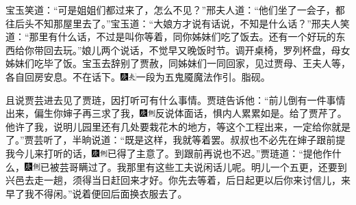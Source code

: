 宝玉笑道：“可是姐姐们都过来了，怎么不见？”邢夫人道：“他们坐了一会子，都往后头不知那屋里去了。”宝玉道：“大娘方才说有话说，不知是什么话？”邢夫人笑道：“那里有什么话，不过是叫你等着，同你姊妹们吃了饭去。还有一个好玩的东西给你带回去玩。”娘儿两个说话，不觉早又晚饭时节。调开桌椅，罗列杯盘，母女姊妹们吃毕了饭。宝玉去辞别了贾赦，同姊妹们一同回家，见过贾母、王夫人等，各自回房安息。不在话下。{\includegraphics[width=3mm]{../Images/00004}\includegraphics[width=3mm]{../Images/00012}\footnotesize \kaishu 一段为五鬼魇魔法作引。脂砚。}

且说贾芸进去见了贾琏，因打听可有什么事情。贾琏告诉他：“前儿倒有一件事情出来，偏生你婶子再三求了我，{\includegraphics[width=3mm]{../Images/00004}\includegraphics[width=3mm]{../Images/00011}\footnotesize \kaishu 反说体面话，惧内人累累如是。}给了贾芹了。他许了我，说明儿园里还有几处要栽花木的地方，等这个工程出来，一定给你就是了。”贾芸听了，半晌说道：“既是这样，我就等着罢。叔叔也不必先在婶子跟前提我今儿来打听的话，{\includegraphics[width=3mm]{../Images/00004}\includegraphics[width=3mm]{../Images/00011}\footnotesize \kaishu 已得了主意了。}到跟前再说也不迟。”贾琏道：“提他作什么，{\includegraphics[width=3mm]{../Images/00004}\includegraphics[width=3mm]{../Images/00011}\footnotesize \kaishu 已被芸哥瞒过了。}我那里有这些工夫说闲话儿呢。明儿一个五更，还要到兴邑去走一趟，须得当日赶回来才好。你先去等着，后日起更以后你来讨信儿，来早了我不得闲。”说着便回后面换衣服去了。

